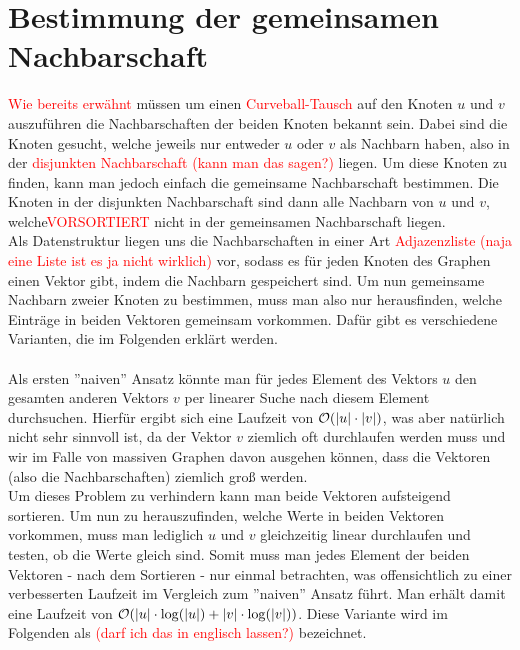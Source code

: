  


\section{Bestimmung der gemeinsamen Nachbarschaft}

\textcolor{red}{Wie bereits erwähnt} müssen um einen \textcolor{red}{Curveball-Tausch} auf den Knoten $u$ und $v$
auszuführen die Nachbarschaften der beiden Knoten bekannt sein. Dabei sind die Knoten gesucht, 
welche jeweils nur entweder $u$ oder $v$ als Nachbarn haben, also in der \textcolor{red}{disjunkten Nachbarschaft (kann man das sagen?)} liegen.
Um diese Knoten zu finden, kann man jedoch einfach die gemeinsame Nachbarschaft bestimmen. Die Knoten
in der disjunkten Nachbarschaft sind dann alle Nachbarn von $u$ und $v$, welche\textcolor{red}{VORSORTIERT}
 nicht in der gemeinsamen
Nachbarschaft liegen. 
\\
Als Datenstruktur liegen uns die Nachbarschaften in einer Art \textcolor{red}{Adjazenzliste (naja eine Liste ist es ja nicht wirklich)}
vor, sodass es für jeden Knoten des Graphen einen Vektor gibt, indem die Nachbarn gespeichert sind.
Um nun gemeinsame Nachbarn
zweier Knoten zu bestimmen, muss man also nur herausfinden, welche Einträge in beiden Vektoren gemeinsam
vorkommen. Dafür gibt es verschiedene Varianten, die 
im Folgenden erklärt werden.
\\
\\
Als ersten ''naiven'' Ansatz könnte man für jedes Element des Vektors $u$ den gesamten anderen 
Vektors $v$ per linearer Suche nach diesem Element durchsuchen. Hierfür ergibt sich eine Laufzeit von
$\mathcal{O}(|u|\cdot|v|)$, was aber natürlich nicht sehr sinnvoll ist, da der Vektor $v$ ziemlich oft 
durchlaufen werden muss und wir 
im Falle von massiven Graphen davon ausgehen können, dass die Vektoren (also die Nachbarschaften)
ziemlich groß werden. 
\\
Um dieses Problem zu verhindern kann man beide Vektoren aufsteigend sortieren. Um nun zu herauszufinden,
welche Werte in beiden Vektoren vorkommen, muss man lediglich $u$ und $v$ gleichzeitig linear durchlaufen
und testen, ob die Werte gleich sind. Somit muss man jedes Element der beiden Vektoren - nach dem Sortieren - 
nur einmal betrachten, was offensichtlich zu einer verbesserten Laufzeit im Vergleich zum ''naiven''
Ansatz führt. Man erhält damit eine Laufzeit von $\mathcal{O}(|u|\cdot \log (|u|)  + |v|\cdot\log(|v|))$. 
Diese Variante wird im Folgenden als \SorSor \textcolor{red}{(darf ich das in
englisch lassen?)} bezeichnet.
